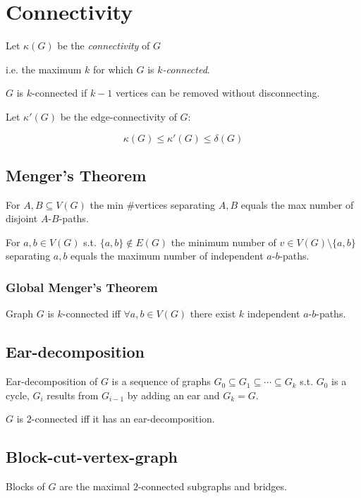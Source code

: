 \section*{Connectivity}

Let $\kappa(G)$ be the \emph{connectivity} of $G$

i.e. the maximum $k$ for which $G$ is \emph{$k$-connected}.

$G$ is $k$-connected if $k-1$ vertices can be removed without disconnecting.

Let $\kappa'(G)$ be the edge-connectivity of $G$:

\vspace*{-3mm}
\[ \kappa(G) \leq \kappa'(G) \leq \delta(G) \]

\subsection*{Menger's Theorem}

For $A,B \subseteq V(G)$ the min \#vertices separating $A, B$ equals the max number of disjoint $A$-$B$-paths.

For $a, b \in V(G)$ s.t. $\{a,b\} \notin E(G)$ the minimum number of $v \in V(G)\setminus\{a,b\}$ separating $a, b$ equals the maximum number of independent $a$-$b$-paths.

\subsubsection*{Global Menger's Theorem}

Graph $G$ is $k$-connected iff $\forall a,b \in V(G)$ there exist $k$ independent $a$-$b$-paths.

\subsection*{Ear-decomposition}

Ear-decomposition of $G$ is a sequence of graphs $G_0 \subseteq G_1 \subseteq \cdots \subseteq G_k$ s.t. $G_0$ is a cycle, $G_i$ results from $G_{i-1}$ by adding an ear and $G_k = G$.

$G$ is $2$-connected iff it has an ear-decomposition.

\subsection*{Block-cut-vertex-graph}

Blocks of $G$ are the maximal $2$-connected subgraphs and bridges.

